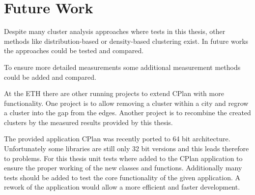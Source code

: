 \chapter{Future Work}
\label{sec:future_work}

Despite many cluster analysis approaches where tests in this thesis, other methods like distribution-based or density-based clustering exist. In future works the approaches could be tested and compared. %

To ensure more detailed measurements some additional measurement methods could be added and compared.

At the ETH there are other running projects to extend CPlan with more functionality. One project is to allow removing a cluster within a city and regrow a cluster into the gap from the edges. Another project is to recombine the created clusters by the measured results provided by this thesis.

The provided application CPlan was recently ported to 64 bit architecture. Unfortunately some libraries are still only 32 bit versions and this leads therefore to problems. For this thesis unit tests where added to the CPlan application to ensure the proper working of the new classes and functions. Additionally many tests should be added to test the core functionality of the given application. A rework of the application would allow a more efficient and faster development.